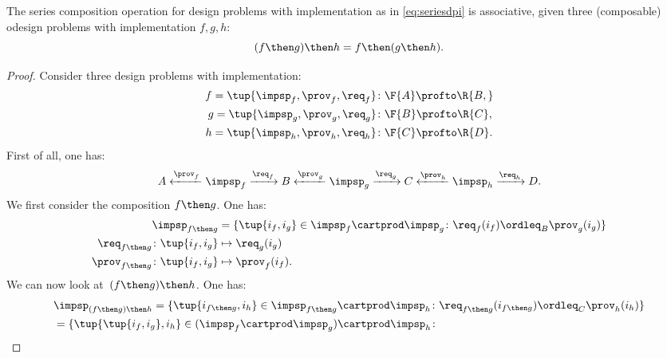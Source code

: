 {	\begin{lemma}
		The series composition operation for design problems with implementation as in \cref{eq:seriesdpi} is associative, \ie  given three (composable) odesign problems with implementation $f,g,h$:
		\begin{equation}
			(f\then g)
			\then h = f\then (g\then h).
		\end{equation}
	\end{lemma}
	\begin{proof}
		Consider three design problems with implementation:
		\begin{equation}
			\begin{aligned}
				f=\tup{{\impsp_f, \prov_f, \req_f} } & \colon \F{A} \profto\R{B,}  \\
				g=\tup{\impsp_g, \prov_g, \req_g}    & \colon \F{B} \profto \R{C}, \\
				h=\tup{\impsp_h, \prov_h, \req_h}    & \colon \F{C} \profto \R{D}.
			\end{aligned}
		\end{equation}
		First of all, one has:
		\begin{equation}
			A \xleftarrow{\prov_f} \impsp_f \xrightarrow{\req_f} B
			\xleftarrow{\prov_g} \impsp_g \xrightarrow{\req_g} C
			\xleftarrow{\prov_h} \impsp_h \xrightarrow{\req_h} D.
		\end{equation}
		We first consider the composition $f\then g$.
		One has:
		\begin{equation}
			\begin{aligned}
				\impsp_{f\then g}                       & = \{
				\tup{i_f,i_g} \in \impsp_f \cartprod \impsp_g \colon
				\req_f(i_f) \ordleq_{B} \prov_g(i_g)
				\}                                                              \\
				\req_{f\then g}  \colon  \tup{i_f,i_g}  & \mapsto \req_g(i_g)   \\
				\prov_{f\then g}  \colon  \tup{i_f,i_g} & \mapsto \prov_f(i_f).
			\end{aligned}
		\end{equation}
		We can now look at~$(f\then g)\then h$.
		One has:
		\begin{equation}
			\begin{aligned}
				 & \impsp_{(f\then g)\then h} = \{
				\tup{i_{f\then g},i_h} \in \impsp_{f\then g} \cartprod \impsp_{h}\colon
				\req_{f\then g}(i_{f\then g}) \ordleq_{C} \prov_h(i_h)
				\}                                 \\
				 & =\{
				\tup{\tup{i_f, i_g},i_h} \in (\impsp_f \cartprod \impsp_g) \cartprod \impsp_{h}\colon

\end{aligned}
\end{equation}
\end{proof}}
